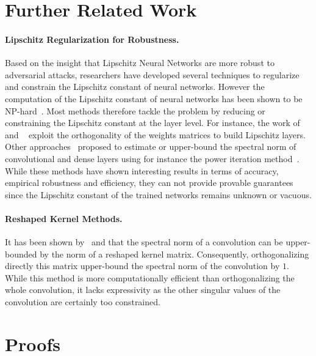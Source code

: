 \onecolumn

\section{Further Related Work}

\paragraph{Lipschitz Regularization for Robustness.}

Based on the insight that Lipschitz Neural Networks are more robust to adversarial attacks, researchers have developed several techniques to regularize and constrain the Lipschitz constant of neural networks.
However the computation of the Lipschitz constant of neural networks has been shown to be NP-hard~\citep{scaman2018lipschitz}.  Most methods therefore tackle the problem by reducing or constraining the Lipschitz constant at the layer level.
For instance, the work of~\citet{cisse2017parseval,huang2020controllable} and ~\citet{wang2020orthogonal} exploit the orthogonality of the weights matrices to build Lipschitz layers.
Other approaches~\citep{gouk2021regularisation,jia2017improving,sedghi2018singular,singla2021fantastic,araujo2021lipschitz} proposed to estimate or upper-bound the spectral norm of convolutional and dense layers using for instance the power iteration method~\citep{golub2000eigenvalue}.
While these methods have shown interesting results in terms of accuracy, empirical robustness and efficiency, they can not provide provable guarantees since the Lipschitz constant of the trained networks remains unknown or vacuous.

\paragraph{Reshaped Kernel Methods.}
It has been shown by~\citet{cisse2017parseval} and \citet{tsuzuku2018lipschitz} that the spectral norm of a convolution can be upper-bounded by the norm of a reshaped kernel matrix. Consequently, orthogonalizing directly this matrix upper-bound the spectral norm of the convolution by $1$.
While this method is more computationally efficient than orthogonalizing the whole convolution, it lacks expressivity as the other singular values of the convolution are certainly too constrained. 





\section{Proofs}

